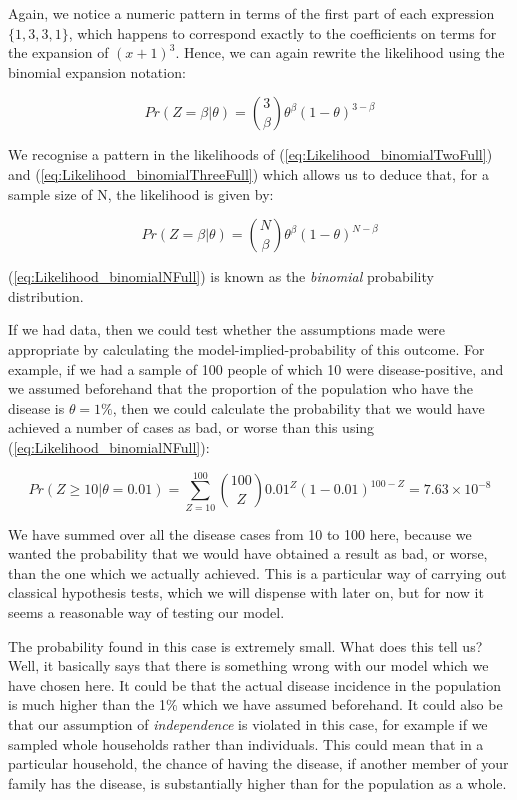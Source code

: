 \documentclass[11pt,fullpage]{book}
\begin{document}
Again, we notice a numeric pattern in terms of the first part of each expression $\{1,3,3,1\}$, which happens to correspond exactly to the coefficients on terms for the expansion of $(x+1)^3$. Hence, we can again rewrite the likelihood using the binomial expansion notation:

\begin{equation}\label{eq:Likelihood_binomialThreeFull}
Pr(Z=\beta|\theta) = {3 \choose \beta} \theta^\beta (1-\theta)^{3-\beta}
\end{equation}

We recognise a pattern in the likelihoods of (\ref{eq:Likelihood_binomialTwoFull}) and (\ref{eq:Likelihood_binomialThreeFull}) which allows us to deduce that, for a sample size of N, the likelihood is given by:

\begin{equation}\label{eq:Likelihood_binomialNFull}
Pr(Z=\beta|\theta) = {N \choose \beta} \theta^\beta (1-\theta)^{N-\beta}
\end{equation}

(\ref{eq:Likelihood_binomialNFull}) is known as the \textit{binomial} probability distribution.

If we had data, then we could test whether the assumptions made were appropriate by calculating the model-implied-probability of this outcome. For example, if we had a sample of 100 people of which 10 were disease-positive, and we assumed beforehand that the proportion of the population who have the disease is $\theta=1\%$, then we could calculate the probability that we would have achieved a number of cases as bad, or worse than this using (\ref{eq:Likelihood_binomialNFull}):

\begin{equation}
Pr(Z\geq 10|\theta=0.01) = \sum\limits_{Z=10}^{100}{100 \choose Z} 0.01^Z (1-0.01)^{100-Z} = 7.63 \times 10^{-8}
\end{equation}\label{eq:Likelihood_binomialTest}

We have summed over all the disease cases from 10 to 100 here, because we wanted the probability that we would have obtained a result as bad, or worse, than the one which we actually achieved. This is a particular way of carrying out classical hypothesis tests, which we will dispense with later on, but for now it seems a reasonable way of testing our model. 

The probability found in this case is extremely small. What does this tell us? Well, it basically says that there is something wrong with our model which we have chosen here. It could be that the actual disease incidence in the population is much higher than the 1\% which we have assumed beforehand. It could also be that our assumption of  \textit{independence} is violated in this case, for example if we sampled whole households rather than individuals. This could mean that in a particular household, the chance of having the disease, if another member of your family has the disease, is substantially higher than for the population as a whole. 
\end{document}
